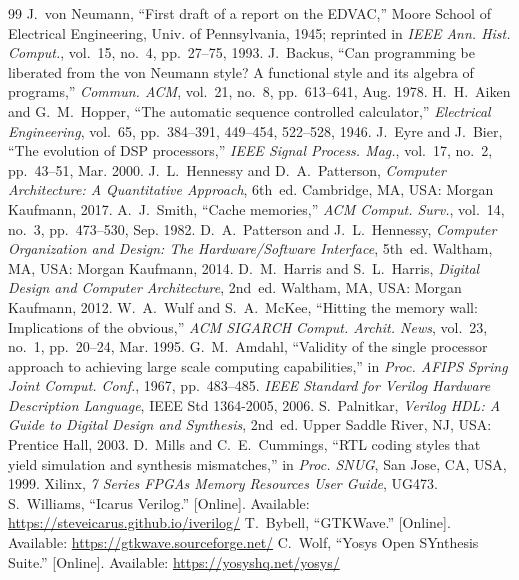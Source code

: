 \documentclass[conference]{IEEEtran}
\begin{document}
\begin{thebibliography}{99}
 J.~von Neumann, ``First draft of a report on the EDVAC,'' Moore School of Electrical Engineering, Univ. of Pennsylvania, 1945; reprinted in \emph{IEEE Ann. Hist. Comput.}, vol.~15, no.~4, pp.~27--75, 1993.
 J.~Backus, ``Can programming be liberated from the von Neumann style? A functional style and its algebra of programs,'' \emph{Commun. ACM}, vol.~21, no.~8, pp.~613--641, Aug. 1978.
 H.~H.~Aiken and G.~M.~Hopper, ``The automatic sequence controlled calculator,'' \emph{Electrical Engineering}, vol.~65, pp.~384--391, 449--454, 522--528, 1946.
 J.~Eyre and J.~Bier, ``The evolution of DSP processors,'' \emph{IEEE Signal Process. Mag.}, vol.~17, no.~2, pp.~43--51, Mar. 2000.
 J.~L.~Hennessy and D.~A.~Patterson, \emph{Computer Architecture: A Quantitative Approach}, 6th~ed. Cambridge, MA, USA: Morgan Kaufmann, 2017.
 A.~J.~Smith, ``Cache memories,'' \emph{ACM Comput. Surv.}, vol.~14, no.~3, pp.~473--530, Sep. 1982.
 D.~A.~Patterson and J.~L.~Hennessy, \emph{Computer Organization and Design: The Hardware/Software Interface}, 5th~ed. Waltham, MA, USA: Morgan Kaufmann, 2014.
 D.~M.~Harris and S.~L.~Harris, \emph{Digital Design and Computer Architecture}, 2nd~ed. Waltham, MA, USA: Morgan Kaufmann, 2012.
 W.~A.~Wulf and S.~A.~McKee, ``Hitting the memory wall: Implications of the obvious,'' \emph{ACM SIGARCH Comput. Archit. News}, vol.~23, no.~1, pp.~20--24, Mar. 1995.
 G.~M.~Amdahl, ``Validity of the single processor approach to achieving large scale computing capabilities,'' in \emph{Proc. AFIPS Spring Joint Comput. Conf.}, 1967, pp.~483--485.
 \emph{IEEE Standard for Verilog Hardware Description Language}, IEEE Std 1364-2005, 2006.
 S.~Palnitkar, \emph{Verilog HDL: A Guide to Digital Design and Synthesis}, 2nd~ed. Upper Saddle River, NJ, USA: Prentice Hall, 2003.
 D.~Mills and C.~E.~Cummings, ``RTL coding styles that yield simulation and synthesis mismatches,'' in \emph{Proc. SNUG}, San Jose, CA, USA, 1999.
 Xilinx, \emph{7 Series FPGAs Memory Resources User Guide}, UG473.
 S.~Williams, ``Icarus Verilog.'' [Online]. Available: \url{https://steveicarus.github.io/iverilog/}
 T.~Bybell, ``GTKWave.'' [Online]. Available: \url{https://gtkwave.sourceforge.net/}
 C.~Wolf, ``Yosys Open SYnthesis Suite.'' [Online]. Available: \url{https://yosyshq.net/yosys/}
\end{thebibliography}
\end{document}
